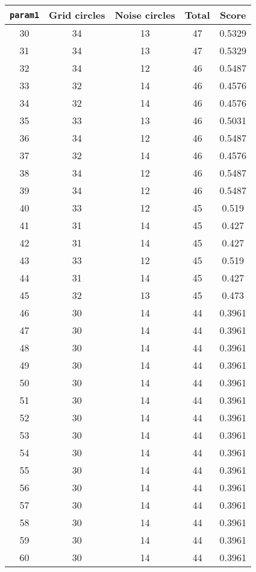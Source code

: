\documentclass[letterpaper, 12pt]{article}
\begin{document}
\begin{longtable}{|c|c|c|c|c|}
\hline
\textbf{\texttt{param1}} & \textbf{Grid circles} & \textbf{Noise circles} & \textbf{Total} & \textbf{Score} \\
\hline
30 & 34 & 13 & 47 & 0.5329 \\
\hline
31 & 34 & 13 & 47 & 0.5329 \\
\hline
32 & 34 & 12 & 46 & 0.5487 \\
\hline
33 & 32 & 14 & 46 & 0.4576 \\
\hline
34 & 32 & 14 & 46 & 0.4576 \\
\hline
35 & 33 & 13 & 46 & 0.5031 \\
\hline
36 & 34 & 12 & 46 & 0.5487 \\
\hline
37 & 32 & 14 & 46 & 0.4576 \\
\hline
38 & 34 & 12 & 46 & 0.5487 \\
\hline
39 & 34 & 12 & 46 & 0.5487 \\
\hline
40 & 33 & 12 & 45 & 0.519 \\
\hline
41 & 31 & 14 & 45 & 0.427 \\
\hline
42 & 31 & 14 & 45 & 0.427 \\
\hline
43 & 33 & 12 & 45 & 0.519 \\
\hline
44 & 31 & 14 & 45 & 0.427 \\
\hline
45 & 32 & 13 & 45 & 0.473 \\
\hline
46 & 30 & 14 & 44 & 0.3961 \\
\hline
47 & 30 & 14 & 44 & 0.3961 \\
\hline
48 & 30 & 14 & 44 & 0.3961 \\
\hline
49 & 30 & 14 & 44 & 0.3961 \\
\hline
50 & 30 & 14 & 44 & 0.3961 \\
\hline
51 & 30 & 14 & 44 & 0.3961 \\
\hline
52 & 30 & 14 & 44 & 0.3961 \\
\hline
53 & 30 & 14 & 44 & 0.3961 \\
\hline
54 & 30 & 14 & 44 & 0.3961 \\
\hline
55 & 30 & 14 & 44 & 0.3961 \\
\hline
56 & 30 & 14 & 44 & 0.3961 \\
\hline
57 & 30 & 14 & 44 & 0.3961 \\
\hline
58 & 30 & 14 & 44 & 0.3961 \\
\hline
59 & 30 & 14 & 44 & 0.3961 \\
\hline
60 & 30 & 14 & 44 & 0.3961 \\

\end{longtable}
\end{document}
